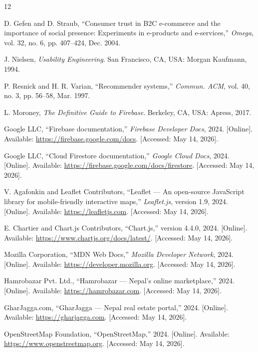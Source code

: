 \documentclass[12pt,a4paper]{report}
\begin{document}
\begin{thebibliography}{12}

D. Gefen and D. Straub, ``Consumer trust in B2C e-commerce and the importance
of social presence: Experiments in e-products and e-services,''
\textit{Omega}, vol. 32, no. 6, pp. 407--424, Dec. 2004.

J. Nielsen, \textit{Usability Engineering}.
San Francisco, CA, USA: Morgan Kaufmann, 1994.

P. Resnick and H. R. Varian, ``Recommender systems,''
\textit{Commun. ACM}, vol. 40, no. 3, pp. 56--58, Mar. 1997.

L. Moroney, \textit{The Definitive Guide to Firebase}.
Berkeley, CA, USA: Apress, 2017.

Google LLC, ``Firebase documentation,'' \textit{Firebase Developer Docs},
2024. [Online]. Available: \url{https://firebase.google.com/docs}.
[Accessed: May 14, 2026].

Google LLC, ``Cloud Firestore documentation,'' \textit{Google Cloud Docs},
2024. [Online]. Available: \url{https://firebase.google.com/docs/firestore}.
[Accessed: May 14, 2026].

V. Agafonkin and Leaflet Contributors,
``Leaflet --- An open-source JavaScript library for mobile-friendly interactive
maps,'' \textit{Leaflet.js}, version 1.9, 2024. [Online]. Available:
\url{https://leafletjs.com}. [Accessed: May 14, 2026].

E. Chartier and Chart.js Contributors, ``Chart.js,'' version 4.4.0, 2024.
[Online]. Available: \url{https://www.chartjs.org/docs/latest/}.
[Accessed: May 14, 2026].

Mozilla Corporation, ``MDN Web Docs,'' \textit{Mozilla Developer Network},
2024. [Online]. Available: \url{https://developer.mozilla.org}.
[Accessed: May 14, 2026].

Hamrobazar Pvt. Ltd., ``Hamrobazar --- Nepal's online marketplace,''
2024. [Online]. Available: \url{https://hamrobazar.com}.
[Accessed: May 14, 2026].

GharJagga.com, ``GharJagga --- Nepal real estate portal,''
2024. [Online]. Available: \url{https://gharjagga.com}.
[Accessed: May 14, 2026].

OpenStreetMap Foundation, ``OpenStreetMap,'' 2024. [Online]. Available:
\url{https://www.openstreetmap.org}. [Accessed: May 14, 2026].

\end{thebibliography}
\end{document}
